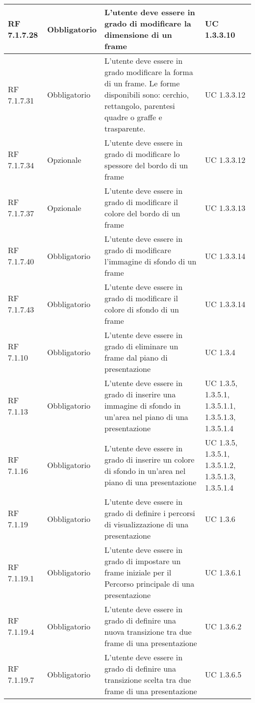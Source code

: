 {\begin{longtable} [c]{| p{2.5cm} | p{2.5cm} | p{6cm} |p{2.5cm}|}
		\hline
		RF 7.1.7.28 & Obbligatorio & L'utente deve essere in grado di modificare la dimensione di un frame\ped{g} & UC 1.3.3.10\\
		\hline
		RF 7.1.7.31 & Obbligatorio & L'utente deve essere in grado modificare la forma di un frame\ped{g}. Le forme disponibili sono: cerchio, rettangolo, parentesi quadre o graffe e trasparente. & UC 1.3.3.12\\
		\hline
		RF 7.1.7.34 & Opzionale & L'utente deve essere in grado di modificare lo spessore del bordo di un frame\ped{g} & UC 1.3.3.12\\
		\hline
		RF 7.1.7.37 & Opzionale & L'utente deve essere in grado di modificare il colore del bordo di un frame\ped{g} & UC 1.3.3.13\\
		\hline
		RF 7.1.7.40 & Obbligatorio & L'utente deve essere in grado di modificare l'immagine di sfondo di un frame\ped{g} & UC 1.3.3.14\\
		\hline
		RF 7.1.7.43 & Obbligatorio & L'utente deve essere in grado di modificare il colore di sfondo di un frame\ped{g} & UC 1.3.3.14\\
		\hline
		RF 7.1.10 & Obbligatorio & L'utente deve essere in grado di eliminare un frame\ped{g} dal piano di presentazione & UC 1.3.4\\
		\hline
		RF 7.1.13 & Obbligatorio & L'utente deve essere in grado di inserire una immagine di sfondo in un’area nel piano di una presentazione & UC 1.3.5, 1.3.5.1, 1.3.5.1.1, 1.3.5.1.3, 1.3.5.1.4\\
		\hline
		RF 7.1.16 & Obbligatorio & L'utente deve essere in grado di inserire un colore di sfondo in un’area nel piano di una presentazione & UC 1.3.5, 1.3.5.1, 1.3.5.1.2, 1.3.5.1.3, 1.3.5.1.4\\
		\hline
		RF 7.1.19 & Obbligatorio & L'utente deve essere in grado di definire i percorsi\ped{g} di visualizzazione di una presentazione & UC 1.3.6\\
		\hline
		RF 7.1.19.1 & Obbligatorio & L'utente deve essere in grado di impostare un frame\ped{g} iniziale per il Percorso\ped{g} principale di una presentazione & UC 1.3.6.1\\
		\hline
		RF 7.1.19.4 & Obbligatorio & L’utente deve essere in grado di definire una nuova transizione tra due frame\ped{g} di una presentazione & UC 1.3.6.2\\
		\hline
		RF 7.1.19.7 & Obbligatorio & L'utente deve essere in grado di definire una transizione scelta tra due frame\ped{g} di una presentazione & UC 1.3.6.5\\

\end{longtable}}
